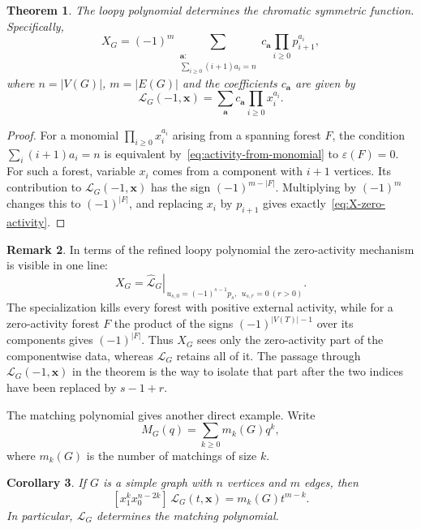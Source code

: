 \documentclass[11pt]{article}
\theoremstyle{plain}
\newtheorem{theorem}{Theorem}[section]
\newtheorem{corollary}[theorem]{Corollary}
\theoremstyle{definition}
\newtheorem{remark}[theorem]{Remark}
\renewcommand{\mathcal}{\mathscr}
\newcommand{\ds}{\displaystyle}
\newcommand{\LL}{\mathcal{L}}    %
\newcommand{\ba}{\mathbf{a}}
\newcommand{\bx}{\mathbf{x}}
\newcommand{\eps}{\varepsilon}
\numberwithin{equation}{section}
\begin{document}
\begin{theorem}\label{thm:L-determines-X}
The loopy polynomial determines the chromatic symmetric function. Specifically,
\begin{equation}\label{eq:X-from-L}
   X_G    = (-1)^m
   \sum_{\substack{\ba:\\
      \sum_{i\ge 0}(i+1)a_i=n}}
   c_{\ba} \prod_{i\ge 0}p_{i+1}^{a_i},
\end{equation}
where $n=|V(G)|$, $m=|E(G)|$ and the coefficients $c_\ba$ are given by
\[
  \LL_G(-1,\bx)=\sum_{\ba}c_{\ba}
  \prod_{i\ge 0}x_i^{a_i}.
\]
\end{theorem}

\begin{proof}
  For a monomial $\ds \prod_{i\ge 0}x_i^{a_i}$
arising from a spanning forest $F$, the condition
  $\ds  \sum_i(i+1)a_i=n$
is equivalent by~\eqref{eq:activity-from-monomial} to
$\eps(F)=0$.  For such a forest, variable $x_i$ comes from a component with $i+1$ vertices.
Its contribution to $\LL_G(-1,\bx)$ has the sign  $(-1)^{m-|F|}.$
Multiplying by $(-1)^m$ changes this to $(-1)^{|F|}$, and replacing
$x_i$ by $p_{i+1}$ gives exactly~\eqref{eq:X-zero-activity}.
\end{proof}

\begin{remark}\label{rem:X-zero-activity-part}
In terms of the refined loopy polynomial the zero-activity mechanism is visible in one line:
\[
   X_G=
   \left.\widehat{\LL}_G\right|_{\,u_{s,0}=(-1)^{s-1}p_s,\ \ u_{s,r}=0\ (r>0)} .
\]
The specialization kills every forest with positive external activity, while
for a zero-activity forest $F$ the product of the signs $(-1)^{|V(T)|-1}$ over
its components gives $(-1)^{|F|}$.  Thus $X_G$ sees only the zero-activity part of the componentwise data, whereas $\LL_G$ retains all of it.  The passage through $\LL_G(-1,\bx)$ in the theorem is the way to isolate that part after
the two indices have been replaced by $s-1+r$.
\end{remark}

The matching polynomial gives another direct example.  Write
\[
   M_G(q)=\sum_{k\ge 0}m_k(G)q^k,
\]
where $m_k(G)$ is the number of matchings of size $k$.

\begin{corollary}\label{cor:matching}
If $G$ is a simple graph with $n$ vertices and $m$ edges, then
\begin{equation}\label{eq:matching-from-L}
   [x_1^k x_0^{n-2k}]\,\LL_G(t,\bx)
   =m_k(G)t^{m-k}.
\end{equation}
In particular, $\LL_G$ determines the matching polynomial.
\end{corollary}
\end{document}

